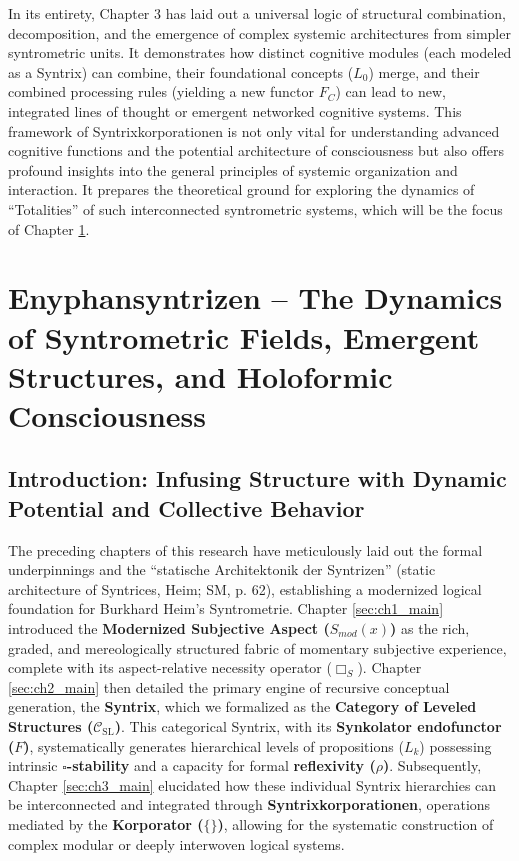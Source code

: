 \documentclass[
    12pt,              %
    a4paper,           %
    headings=normal,   %
    twoside=true,      %
    BCOR=8mm,          %
]{scrbook}
\newcommand{\q}[1]{\enquote{#1}}
\newcommand{\BoxS}{\Box_S}
\newcommand{\BoxSyn}{\square}
\begin{document}
In its entirety, Chapter 3 has laid out a universal logic of structural combination, decomposition, and the emergence of complex systemic architectures from simpler syntrometric units. It demonstrates how distinct cognitive modules (each modeled as a Syntrix) can combine, their foundational concepts (\(L_0\)) merge, and their combined processing rules (yielding a new functor \(F_C\)) can lead to new, integrated lines of thought or emergent networked cognitive systems. This framework of Syntrixkorporationen is not only vital for understanding advanced cognitive functions and the potential architecture of consciousness but also offers profound insights into the general principles of systemic organization and interaction. It prepares the theoretical ground for exploring the dynamics of \q{Totalities} of such interconnected syntrometric systems, which will be the focus of Chapter \ref{sec:ch4_main}.

\chapter{Enyphansyntrizen – The Dynamics of Syntrometric Fields, Emergent Structures, and Holoformic Consciousness}
\label{sec:ch4_main}

\section{Introduction: Infusing Structure with Dynamic Potential and Collective Behavior}
\label{sec:ch4_intro} 

The preceding chapters of this research have meticulously laid out the formal underpinnings and the \q{statische Architektonik der Syntrizen} (static architecture of Syntrices, Heim; SM, p. 62), establishing a modernized logical foundation for Burkhard Heim's Syntrometrie. Chapter \ref{sec:ch1_main} introduced the \textbf{Modernized Subjective Aspect (\(S_{mod}(x)\))} as the rich, graded, and mereologically structured fabric of momentary subjective experience, complete with its aspect-relative necessity operator (\(\BoxS\)). Chapter \ref{sec:ch2_main} then detailed the primary engine of recursive conceptual generation, the \textbf{Syntrix}, which we formalized as the \textbf{Category of Leveled Structures (\(\mathcal{C}_{\text{SL}}\))}. This categorical Syntrix, with its \textbf{Synkolator endofunctor (\(F\))}, systematically generates hierarchical levels of propositions (\(L_k\)) possessing intrinsic \textbf{\(\BoxSyn\)-stability} and a capacity for formal \textbf{reflexivity (\(\rho\))}. Subsequently, Chapter \ref{sec:ch3_main} elucidated how these individual Syntrix hierarchies can be interconnected and integrated through \textbf{Syntrixkorporationen}, operations mediated by the \textbf{Korporator (\(\{ \}\))}, allowing for the systematic construction of complex modular or deeply interwoven logical systems.
\end{document}
